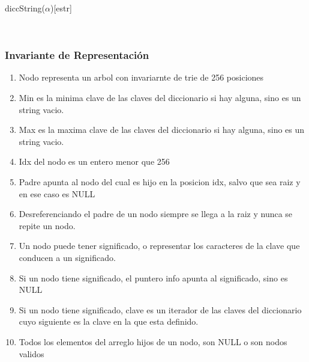 \begin{Estructura}{ diccString($\alpha$)}[estr]
	\begin{Tupla}[estr]
	\end{Tupla}

	~

	\begin{Tupla}[Nodo]
	\end{Tupla}

\end{Estructura}

\subsubsection{Invariante de Representación}



\begin{enumerate}
	\item Nodo representa un arbol con invariarnte de trie de 256 posiciones
	\item Min es la minima clave de las claves del diccionario si hay alguna, sino es un string vacio.
	\item Max es la maxima clave de las claves del diccionario si hay alguna, sino es un string vacio.
	\item Idx del nodo es un entero menor que 256
	\item Padre apunta al nodo del cual es hijo en la posicion idx, salvo que sea raiz y en ese caso es NULL 
	\item Desreferenciando el padre de un nodo siempre se llega a la raiz y nunca se repite un nodo.
	\item Un nodo puede tener significado, o representar los caracteres de la clave que conducen a un significado.
	\item Si un nodo tiene significado, el puntero info apunta al significado, sino es NULL
	\item Si un nodo tiene significado, clave es un iterador de las claves del diccionario cuyo siguiente es la clave en la que esta definido.
	\item Todos los elementos del arreglo hijos de un nodo, son NULL o son nodos validos

\end{enumerate}



